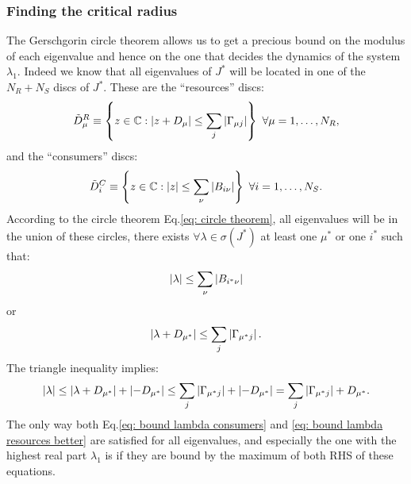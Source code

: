 \documentclass[12pt, titlepage, twoside, openright]{report}
\begin{document}
\subsubsection{Finding the critical radius}\label{sec : find critical radius}
\noindent The Gerschgorin circle theorem allows us to get a precious bound on the modulus of each eigenvalue and hence on the one that decides the dynamics of the system $\lambda_1$. Indeed we know that all eigenvalues of $J^*$ will be located in one of the $N_R + N_S$ discs of $J^*$. These are the ``resources'' discs:
\begin{equation}
\tilde{D}^R_\mu  \defined \left\{ z \in \mathbb{C}: \abs{z+D_\mu} \leq \sum_j \abs{\Gamma_{\mu j}} \right\}  \ \forall \mu = 1, \dots, N_R,
\end{equation}
and the ``consumers'' discs:
\begin{equation}
\tilde{D}^C_i \equiv \left\{ z \in \mathbb{C}: \left|{z}\right| \leq \sum_\nu \left|{B_{i\nu}}\right|\right\} \ \forall i=1, \dots, N_S.
\end{equation}
According to the circle theorem Eq.\eqref{eq: circle theorem}, all eigenvalues will be in the union of these circles, \ie there exists $\forall \lambda \in \sigma\left(J^*\right)$ at least one $\mu^*$ or  one $i^*$ such that:
\begin{equation}
\left|{\lambda}\right| \leq \sum_\nu \left|{B_{i^*\nu}}\right| \label{eq: bound lambda consumers}
\end{equation}
or
\begin{equation}
\left|{\lambda+D_{\mu^*}}\right| \leq \sum_j \left|{\Gamma_{\mu^* j}}\right|. \label{eq: bound lambda 1 resources}
\end{equation}
The triangle inequality implies:
\begin{equation}
\left|{\lambda}\right| \leq \left|{\lambda+D_{\mu^*}}\right|+\left|{-D_{\mu^*}}\right| \leq \sum_j \left|{\Gamma_{\mu^* j}}\right| + \left|{-D_{\mu^*}}\right| = \sum_j \left|{\Gamma_{\mu^* j}}\right| + D_{\mu^*}.\label{eq: bound lambda resources better}
\end{equation}
The only way both Eq.\eqref{eq: bound lambda consumers} and \eqref{eq: bound lambda resources better} are satisfied for all eigenvalues, and especially the one with the highest real part $\lambda_1$ is if they are bound by the maximum of both RHS of these equations.
\end{document}
